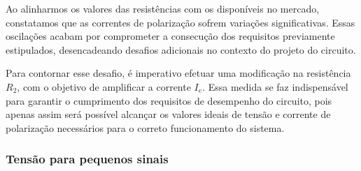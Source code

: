 Ao alinharmos os valores das resistências com os disponíveis no mercado, constatamos que as correntes de polarização sofrem variações significativas. Essas oscilações acabam por comprometer a consecução dos requisitos previamente estipulados, desencadeando desafios adicionais no contexto do projeto do circuito.

Para contornar esse desafio, é imperativo efetuar uma modificação na resistência $R_2$, com o objetivo de amplificar a corrente $I_e$. Essa medida se faz indispensável para garantir o cumprimento dos requisitos de desempenho do circuito, pois apenas assim será possível alcançar os valores ideais de tensão e corrente de polarização necessários para o correto funcionamento do sistema.


\subsubsection{Tensão para pequenos sinais}